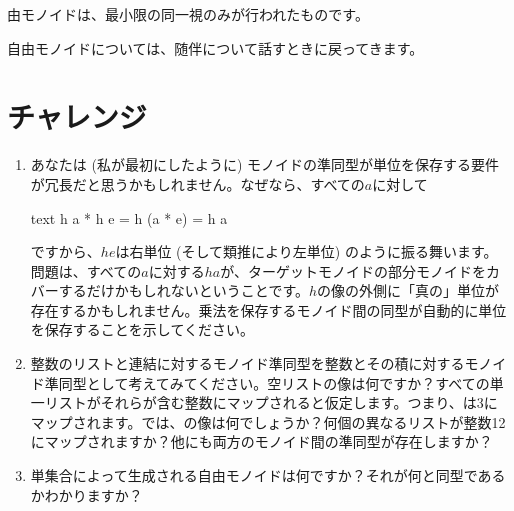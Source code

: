 由モノイドは、最小限の同一視のみが行われたものです。

自由モノイドについては、随伴について話すときに戻ってきます。

\section{チャレンジ}

\begin{enumerate}
  \tightlist
  \item
        あなたは (私が最初にしたように) モノイドの準同型が単位を保存する要件が冗長だと思うかもしれません。なぜなら、すべての$a$に対して

        \begin{snip}{text}
h a * h e = h (a * e) = h a
\end{snip}
        ですから、$h e$は右単位 (そして類推により左単位) のように振る舞います。問題は、すべての$a$に対する$h a$が、ターゲットモノイドの部分モノイドをカバーするだけかもしれないということです。$h$の像の外側に「真の」単位が存在するかもしれません。乗法を保存するモノイド間の同型が自動的に単位を保存することを示してください。
  \item
        整数のリストと連結に対するモノイド準同型を整数とその積に対するモノイド準同型として考えてみてください。空リスト\code{{[}{]}}の像は何ですか？すべての単一リストがそれらが含む整数にマップされると仮定します。つまり、\code{{[}3{]}}は3にマップされます。では、\code{{[}1, 2, 3, 4{]}}の像は何でしょうか？何個の異なるリストが整数12にマップされますか？他にも両方のモノイド間の準同型が存在しますか？
  \item
        単集合によって生成される自由モノイドは何ですか？それが何と同型であるかわかりますか？
\end{enumerate}

